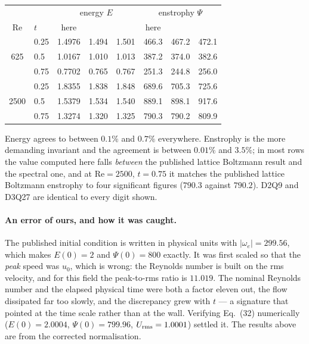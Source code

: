 \documentclass[11pt,a4paper]{article}
\begin{document}
\begin{center}\small
\begin{tabular}{clccc|ccc}
\toprule
 & & \multicolumn{3}{c|}{energy $E$} & \multicolumn{3}{c}{enstrophy $\Psi$} \\
$\mathrm{Re}$ & $t$ & here & \cite{mohammed2018} & \cite{clercx2006}
              & here & \cite{mohammed2018} & \cite{clercx2006} \\
\midrule
     & 0.25 & 1.4976 & 1.494 & 1.501 & 466.3 & 467.2 & 472.1 \\
625  & 0.5  & 1.0167 & 1.010 & 1.013 & 387.2 & 374.0 & 382.6 \\
     & 0.75 & 0.7702 & 0.765 & 0.767 & 251.3 & 244.8 & 256.0 \\
\midrule
     & 0.25 & 1.8355 & 1.838 & 1.848 & 689.6 & 705.3 & 725.6 \\
2500 & 0.5  & 1.5379 & 1.534 & 1.540 & 889.1 & 898.1 & 917.6 \\
     & 0.75 & 1.3274 & 1.320 & 1.325 & 790.3 & 790.2 & 809.9 \\
\bottomrule
\end{tabular}
\end{center}

\noindent Energy agrees to between $0.1\%$ and $0.7\%$ everywhere. Enstrophy is
the more demanding invariant and the agreement is between $0.01\%$ and $3.5\%$;
in most rows the value computed here falls \emph{between} the published lattice
Boltzmann result and the spectral one, and at $\mathrm{Re}=2500$, $t=0.75$ it
matches the published lattice Boltzmann enstrophy to four significant figures
($790.3$ against $790.2$). D2Q9 and D3Q27 are identical to every digit shown.

\paragraph{An error of ours, and how it was caught.} The published initial
condition is written in physical units with $|\omega_e| = 299.56$, which makes
$E(0)=2$ and $\Psi(0)=800$ exactly. It was first scaled so that the \emph{peak}
speed was $u_0$, which is wrong: the Reynolds number is built on the rms
velocity, and for this field the peak-to-rms ratio is $11.019$. The nominal
Reynolds number and the elapsed physical time were both a factor eleven out, the
flow dissipated far too slowly, and the discrepancy grew with $t$ --- a
signature that pointed at the time scale rather than at the wall. Verifying
Eq.~(32) numerically ($E(0)=2.0004$, $\Psi(0)=799.96$, $U_{\rm rms}=1.0001$)
settled it. The results above are from the corrected normalisation.
\end{document}
